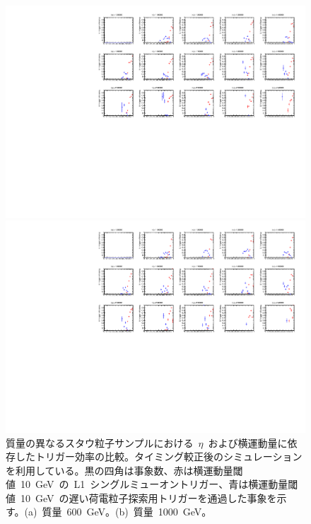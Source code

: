 \begin{figure}[H]
    \begin{minipage}{0.49\hsize}
    \centering   
    \includegraphics[width=\textwidth,page=14]{img/rec/stau_600.pdf}
    \subcaption{}
    \end{minipage}
    \begin{minipage}{0.49\hsize}
    \centering   
    \includegraphics[width=\textwidth,page=14]{img/rec/stau_1000.pdf}
    \subcaption{}
    \end{minipage}
    \caption[質量の異なるスタウ粒子サンプルにおける~$\eta$~および横運動量に依存したトリガー効率の比較]{質量の異なるスタウ粒子サンプルにおける~$\eta$~および横運動量に依存したトリガー効率の比較。タイミング較正後のシミュレーションを利用している。黒の四角は事象数、赤は横運動量閾値~10~GeV~の~L1~シングルミューオントリガー、青は横運動量閾値~10~GeV~の遅い荷電粒子探索用トリガーを通過した事象を示す。(a)~質量~600~GeV。(b)~質量~1000~GeV。}\label{fig:tripteta6}
\end{figure}
